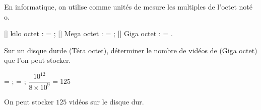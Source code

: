     En informatique, on utilise comme unités de mesure les multiples de l’octet noté o.

    \begin{itemize}
        \def\item{}
        \item[] kilo octet :  = ;
        \item[] Mega octet :  = ;
        \item[] Giga octet :  = .
    \end{itemize}

    Sur un disque durde  (Téra octet), déterminer le nombre de vidéos de  (Giga octet)
    que l'on peut stocker.

    {\red
     = ;  = ; $\dfrac{10^{12}}{8\times 10^9} = 125$

    On peut stocker $125$ vidéos sur le disque dur.
    }
